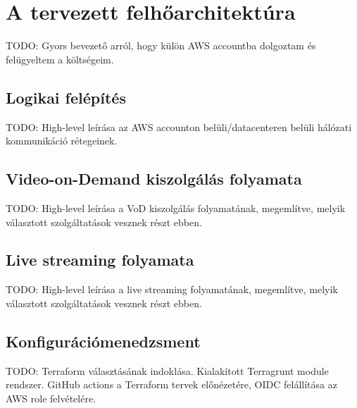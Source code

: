 \chapter{A tervezett felhőarchitektúra}

TODO: Gyors bevezető arról, hogy külön AWS accountba dolgoztam és felügyeltem a költségeim.

\section{Logikai felépítés}

TODO: High-level leírása az AWS accounton belüli/datacenteren belüli hálózati kommunikáció rétegeinek.

\section{Video-on-Demand kiszolgálás folyamata}

TODO: High-level leírása a VoD kiszolgálás folyamatának, megemlítve, melyik választott szolgáltatások vesznek részt ebben.

\section{Live streaming folyamata}

TODO: High-level leírása a live streaming folyamatának, megemlítve, melyik választott szolgáltatások vesznek részt ebben.

\section{Konfigurációmenedzsment}

TODO: Terraform választásának indoklása. Kialakított Terragrunt module rendszer. GitHub actions a Terraform tervek előnézetére, OIDC felállítása az AWS role felvételére.
